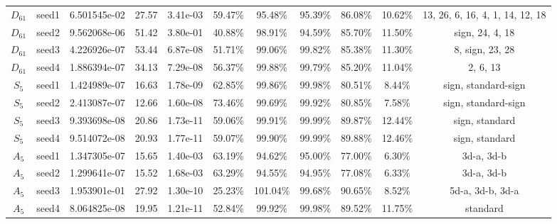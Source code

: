 \begin{tabular}{ccccccccccc}
 $D_{61}$ & seed1 & 6.501545e-02 &     27.57 &  3.41e-03 &   59.47\% &   95.48\% &   95.39\% & 86.08\% &            10.62\% & 13, 26, 6, 16, 4, 1, 14, 12, 18 \\
 $D_{61}$ & seed2 & 9.562068e-06 &     51.42 &  3.80e-01 &   40.88\% &   98.91\% &   94.59\% & 85.70\% &            11.50\% &                 sign, 24, 4, 18 \\
 $D_{61}$ & seed3 & 4.226926e-07 &     53.44 &  6.87e-08 &   51.71\% &   99.06\% &   99.82\% & 85.38\% &            11.30\% &                 8, sign, 23, 28 \\
 $D_{61}$ & seed4 & 1.886394e-07 &     34.13 &  7.29e-08 &   56.37\% &   99.88\% &   99.79\% & 85.20\% &            11.04\% &                        2, 6, 13 \\
  $S_{5}$ & seed1 & 1.424989e-07 &     16.63 &  1.78e-09 &   62.85\% &   99.86\% &   99.98\% & 80.51\% &             8.44\% &             sign, standard-sign \\
  $S_{5}$ & seed2 & 2.413087e-07 &     12.66 &  1.60e-08 &   73.46\% &   99.69\% &   99.92\% & 80.85\% &             7.58\% &             sign, standard-sign \\
  $S_{5}$ & seed3 & 9.393698e-08 &     20.86 &  1.73e-11 &   59.06\% &   99.91\% &   99.99\% & 89.87\% &            12.44\% &                  sign, standard \\
  $S_{5}$ & seed4 & 9.514072e-08 &     20.93 &  1.77e-11 &   59.07\% &   99.90\% &   99.99\% & 89.88\% &            12.46\% &                  sign, standard \\
  $A_{5}$ & seed1 & 1.347305e-07 &     15.65 &  1.40e-03 &   63.19\% &   94.62\% &   95.00\% & 77.00\% &             6.30\% &                      3d-a, 3d-b \\
  $A_{5}$ & seed2 & 1.299641e-07 &     15.52 &  1.68e-03 &   63.29\% &   94.55\% &   94.95\% & 77.08\% &             6.33\% &                      3d-a, 3d-b \\
  $A_{5}$ & seed3 & 1.953901e-01 &     27.92 &  1.30e-10 &   25.23\% &  101.04\% &   99.68\% & 90.65\% &             8.52\% &                5d-a, 3d-b, 3d-a \\
  $A_{5}$ & seed4 & 8.064825e-08 &     19.95 &  1.21e-11 &   52.84\% &   99.92\% &   99.98\% & 89.52\% &            11.75\% &                        standard \\
\bottomrule
\end{tabular}
